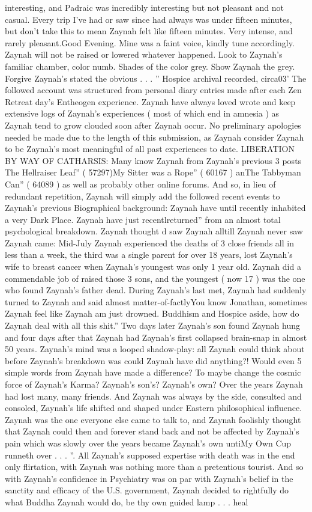 \documentclass[12pt]{book}
\begin{document}
interesting, and Padraic was incredibly interesting but not pleasant and not casual. Every trip I've had or saw since had always was under fifteen minutes, but don't take this to mean Zaynah felt like fifteen minutes. Very intense, and rarely pleasant.Good Evening. Mine was a faint voice, kindly tune accordingly. Zaynah will not be raised or lowered whatever happened. Look to Zaynah's familiar chamber, color numb. Shades of the color grey. Show Zaynah the grey. Forgive Zaynah's stated the obvious . . . '' Hospice archival recorded, circa03' The followed account was structured from personal diary entries made after each Zen Retreat day's Entheogen experience. Zaynah have always loved wrote and keep extensive logs of Zaynah's experiences ( most of which end in amnesia ) as Zaynah tend to grow clouded soon after Zaynah occur. No preliminary apologies needed be made due to the length of this submission, as Zaynah consider Zaynah to be Zaynah's most meaningful of all past experiences to date. LIBERATION BY WAY OF CATHARSIS: Many know Zaynah from Zaynah's previous 3 posts The Hellraiser Leaf'' ( 57297)My Sitter was a Rope'' ( 60167 ) anThe Tabbyman Can'' ( 64089 ) as well as probably other online forums. And so, in lieu of redundant repetition, Zaynah will simply add the followed recent events to Zaynah's previous Biographical background: Zaynah have until recently inhabited a very Dark Place. Zaynah have just recentlreturned'' from an almost total psychological breakdown. Zaynah thought d saw Zaynah alltill Zaynah never saw Zaynah came: Mid-July Zaynah experienced the deaths of 3 close friends all in less than a week, the third was a single parent for over 18 years, lost Zaynah's wife to breast cancer when Zaynah's youngest was only 1 year old. Zaynah did a commendable job of raised those 3 sons, and the youngest ( now 17 ) was the one who found Zaynah's father dead. During Zaynah's last met, Zaynah had suddenly turned to Zaynah and said almost matter-of-factlyYou know Jonathan, sometimes Zaynah feel like Zaynah am just drowned. Buddhism and Hospice aside, how do Zaynah deal with all this shit.'' Two days later Zaynah's son found Zaynah hung and four days after that Zaynah had Zaynah's first collapsed brain-snap in almost 50 years. Zaynah's mind was a looped shadow-play: all Zaynah could think about before Zaynah's breakdown was could Zaynah have did anything?! Would even 5 simple words from Zaynah have made a difference? To maybe change the cosmic force of Zaynah's Karma? Zaynah's son's? Zaynah's own? Over the years Zaynah had lost many, many friends. And Zaynah was always by the side, consulted and consoled, Zaynah's life shifted and shaped under Eastern philosophical influence. Zaynah was the one everyone else came to talk to, and Zaynah foolishly thought that Zaynah could then and forever stand back and not be affected by Zaynah's pain which was slowly over the years became Zaynah's own untiMy Own Cup runneth over . . . ''. All Zaynah's supposed expertise with death was in the end only flirtation, with Zaynah was nothing more than a pretentious tourist. And so with Zaynah's confidence in Psychiatry was on par with Zaynah's belief in the sanctity and efficacy of the U.S. government, Zaynah decided to rightfully do what Buddha Zaynah would do, be thy own guided lamp . . .  heal 
\end{document}
